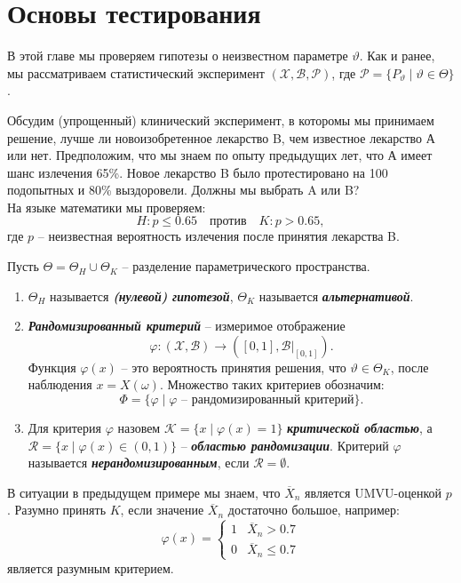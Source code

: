 \graphicspath{{./chapters/chapter06/}}
\chapter{Основы тестирования}

В этой главе мы проверяем гипотезы о неизвестном параметре $\vartheta$. Как и ранее, мы рассматриваем статистический эксперимент $(\mathcal{X}, \mathcal{B}, \mathcal{P})$, где $\mathcal{P}=\{ P_\vartheta \mid \vartheta \in \Theta \}$.

\begin{exmp}
	Обсудим (упрощенный) клинический эксперимент, в которомы мы принимаем решение, лучше ли новоизобретенное лекарство B, чем известное лекарство А или нет. Предположим, что мы знаем по опыту предыдущих лет, что А имеет шанс излечения 65\%. Новое лекарство B было протестировано на 100 подопытных и 80\% выздоровели. Должны мы выбрать A или B? \\
	На языке математики мы проверяем:
	\[ H: p \leq 0.65 \quad \text{против} \quad K: p > 0.65, \]
	где $p$ -- неизвестная вероятность излечения после принятия лекарства B.
\end{exmp}

\begin{defn}
	Пусть $\Theta = \Theta_H \cup \Theta_K$  -- разделение параметрического пространства.
	\begin{enumerate}
		\item $\Theta_H$ называется \textbf{\textit{(нулевой) гипотезой}}, $\Theta_K$ называется \textbf{\textit{альтернативой}}.
		\item \textbf{\textit{Рандомизированный критерий}} -- измеримое отображение
		\[ \varphi:(\mathcal{X}, \mathcal{B}) \rightarrow ([0, 1], \mathcal{B}|_{[0,1]}). \]
		Функция $\varphi(x)$ -- это вероятность принятия решения, что $\vartheta \in \Theta_K$, после наблюдения $x=X(\omega)$. Множество таких критериев обозначим:
		\[ \Phi = \{ \varphi \mid \varphi \text{ -- рандомизированный критерий} \}. \]
		\item Для критерия $\varphi$ назовем $\mathcal{K}= \{x \mid \varphi(x)=1 \}$ \textbf{\textit{критической областью}}, а $\mathcal{R}= \{x \mid \varphi(x) \in (0,1) \}$ -- \textbf{\textit{областью рандомизации}}. Критерий $\varphi$ называется \textbf{\textit{нерандомизированным}}, если $\mathcal{R} = \emptyset$. 
	\end{enumerate}
\end{defn}

\begin{exmp} \label{exmp6.3}
	В ситуации в предыдущем примере мы знаем, что $\overline{X}_n$ является UMVU-оценкой $p$. Разумно принять $K$, если значение $\overline{X}_n$ достаточно большое, например:
	\[ \varphi(x) =
	\left \{
	\begin{array}{cl}
	1 & \overline{X}_n > 0.7 \\
	0 & \overline{X}_n \leq 0.7 
	\end{array}
	\right.
	\] 
	является разумным критерием.
\end{exmp}

